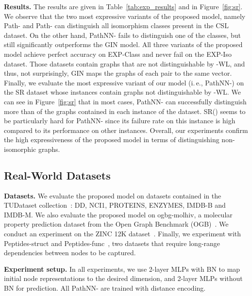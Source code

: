 \documentclass{article}
\theoremstyle{plain}
\theoremstyle{definition}
\theoremstyle{remark}
\newcommand{\ie}{i.\,e., }
\begin{document}
\textbf{Results.}
The results are given in Table~\ref{tab:exp_results} and in Figure~\ref{fig:sr}.
We observe that the two most expressive variants of the proposed model, namely Path- and Path- can distinguish all  isomorphism classes present in the CSL dataset.
On the other hand, PathNN- fails to distinguish one of the  classes, but still significantly outperforms the GIN model.
All three variants of the proposed model achieve perfect accuracy on EXP-Class and never fail on the EXP-Iso dataset.
Those datasets contain graphs that are not distinguishable by -WL, and thus, not surprisingly, GIN maps the graphs of each pair to the same vector.
Finally, we evaluate the most expressive variant of our model (\ie PathNN-) on the SR dataset whose instances contain graphs not distinguishable by -WL.
We can see in Figure~\ref{fig:sr} that in most cases, PathNN- can successfully distinguish more than  of the graphs contained in each instance of the dataset.
SR() seems to be particularly hard for PathNN- since its failure rate on this instance is high compared to its performance on other instances. 
Overall, our experiments confirm the high expressiveness of the proposed model in terms of distinguishing non-isomorphic graphs.

\subsection{Real-World Datasets}
\label{sec:RealWorldDatasets}


\textbf{Datasets.}
We evaluate the proposed model on  datasets contained in the TUDataset collection~\cite{morris2020tudataset}: DD, NCI1, PROTEINS, ENZYMES, IMDB-B and IMDB-M.
We also evaluate the proposed model on ogbg-molhiv, a molecular property prediction dataset from the Open Graph Benchmark (OGB)~\cite{hu2020open}.
We conduct an experiment on the ZINC 12K dataset~\cite{dwivedi2020benchmarking}.
Finally, we experiment with Peptides-struct and Peptides-func~\cite{dwivedi2022long}, two datasets that require long-range dependencies between nodes to be captured.

\textbf{Experiment setup.}
In all experiments, we use 2-layer MLPs with BN to map initial node representations to the desired dimension, and 2-layer MLPs without BN for prediction. All PathNN- are trained with distance encoding. 
\end{document}
